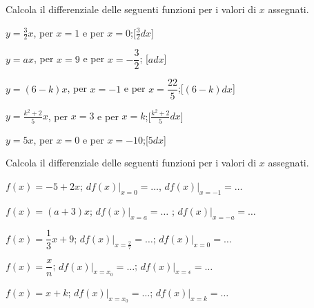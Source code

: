  \begin{esercizio}\label{ese:dif03}
Calcola il differenziale delle seguenti funzioni per i valori di $x$ assegnati.
 \begin{enumeratea}
  \item  $y=\frac{3}{2}x$, \hspace{5mm}per $x=1$ e per $x=0$;\hfill [$\frac{3}{2}dx$]
  \item  $y=ax$, \hspace{5mm}per $x=9$ e per $x=-\dfrac{3}{2}$; \hfill [$adx$]
  \item  $y=(6-k)x$, \hspace{5mm}per $x=-1$ e per $x=\dfrac{22}{5}$;\hfill [$(6-k)dx$]
  \item  $y=\frac{k^2+2}{5}x$, \hspace{5mm}per $x=3$ e per $x=k$;\hfill [$\frac{k^2+2}{5}dx$]
  \item  $y=5x$, \hspace{5mm}per $x=0$ e per $x=-10$;\hfill [$5dx$]
 \end{enumeratea}
\end{esercizio}
 
\begin{esercizio}\label{ese:dif04}
Calcola il differenziale delle seguenti funzioni per i valori di $x$ assegnati.
 \begin{enumeratea}
  \item  \(f(x) = -5+2x\);\hspace{5mm} $df(x)|_{x=0}=\dots$,
  \hspace{5mm}$df(x)|_{x=-1}=\dots$
  \item  \(f(x) = (a+3)x\);\hspace{5mm} $df(x)|_{x=a}=\dots$
  ;\hspace{5mm}   $df(x)|_{x=-a}=\dots$
  \item  \(f(x) = \dfrac{1}{3}x+9\);\hspace{5mm} $df(x)|_{x=\frac{2}{7}}=\dots$;
  \hspace{5mm}   $df(x)|_{x=0}=\dots$
  \item  \(f(x) = \dfrac{x}{n}\);\hspace{5mm} $df(x)|_{x=x_0}=\dots$;
  \hspace{5mm}   $df(x)|_{x=\epsilon}=\dots$
  \item  \(f(x) = x+k\);\hspace{5mm} $df(x)|_{x=x_0}=\dots$;
  \hspace{5mm}   $df(x)|_{x=k}=\dots$
 \end{enumeratea}
\end{esercizio}

